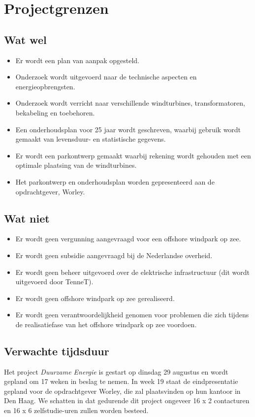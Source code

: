 \section{Projectgrenzen}
\subsection{Wat wel}
\begin{itemize}
\item Er wordt een plan van aanpak opgesteld.
\item Onderzoek wordt uitgevoerd naar de technische aspecten en energieopbrengsten.
\item Onderzoek wordt verricht naar verschillende windturbines, transformatoren, bekabeling en toebehoren.
\item Een onderhoudsplan voor 25 jaar wordt geschreven, waarbij gebruik wordt gemaakt van levensduur- en statistische gegevens.
\item Er wordt een parkontwerp gemaakt waarbij rekening wordt gehouden met een optimale plaatsing van de windturbines.
\item Het parkontwerp en onderhoudsplan worden gepresenteerd aan de opdrachtgever, Worley.
\end{itemize}
\subsection{Wat niet}
\begin{itemize}
\item Er wordt geen vergunning aangevraagd voor een \gls{offshore} windpark op zee.
\item Er wordt geen subsidie aangevraagd bij de Nederlandse overheid.
\item Er wordt geen beheer uitgevoerd over de elektrische infrastructuur (dit wordt uitgevoerd door TenneT\cite{energieakkoord}).
\item Er wordt geen \gls{offshore} windpark op zee gerealiseerd.
\item Er wordt geen verantwoordelijkheid genomen voor problemen die zich tijdens de realisatiefase van het \gls{offshore} windpark op zee voordoen.
\end{itemize}
\subsection{Verwachte tijdsduur}
Het project \textit{Duurzame Energie} is gestart op dinsdag 29 augustus en wordt gepland om 17 weken in beslag te nemen. In week 19 staat de eindpresentatie gepland voor de opdrachtgever Worley, die zal plaatsvinden op hun kantoor in Den Haag. We schatten in dat gedurende dit project ongeveer 16 x 2 contacturen en 16 x 6 zelfstudie-uren zullen worden besteed\cite{studiewijzer}.


